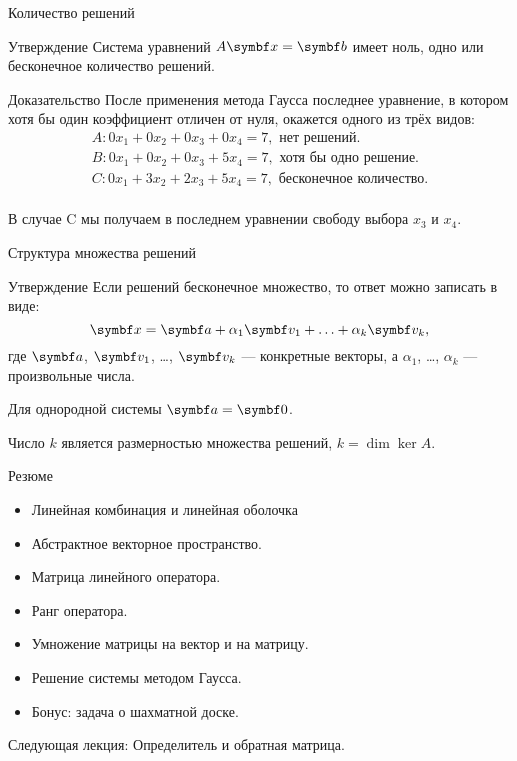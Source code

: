 \begin{frame}{Количество решений}
\begin{block}{Утверждение}
Система уравнений $A \bx = \bb$ имеет ноль, одно или бесконечное количество решений. 
\end{block}

\begin{block}{Доказательство}
После применения метода Гаусса последнее уравнение, в котором хотя бы один коэффициент 
отличен от нуля, окажется одного из трёх видов:
\[
\begin{array}{l}
A: 0x_1 + 0x_2 + 0x_3 + 0x_4 = 7, \text{ нет решений.}\\    
B: 0x_1 + 0x_2 + 0x_3 + 5x_4 = 7, \text{ хотя бы одно решение.} \\
C: 0x_1 + 3x_2 + 2x_3 + 5x_4 = 7, \text{ бесконечное количество.} \\
\end{array}
\]
\end{block}
\pause

В случае C мы получаем в последнем уравнении свободу выбора $x_3$ и $x_4$.

\end{frame}



\begin{frame}{Структура множества решений}

\begin{block}{Утверждение}
Если решений бесконечное множество, то ответ можно записать в виде:
\[
\bx = \ba + \alpha_1 \bv_1 + \ldots + \alpha_k \bv_k,
\]
где $\ba$, $\bv_1$, \ldots, $\bv_k$ — конкретные векторы, а
$\alpha_1$, \ldots, $\alpha_k$ — произвольные числа. 
\end{block}

\pause
Для однородной системы $\ba=\bzero$.

Число $k$ является размерностью множества решений, $k=\dim\ker A$.

\end{frame}




\begin{frame}{Резюме}


\begin{itemize}[<+->]
\item Линейная комбинация и линейная оболочка
\item Абстрактное векторное пространство.
\item Матрица линейного оператора.
\item Ранг оператора. 
\item Умножение матрицы на вектор и на матрицу.
\item Решение системы методом Гаусса.
\item Бонус: задача о шахматной доске.
\end{itemize}
\pause
\alert{Следующая лекция:} Определитель и обратная матрица.



\end{frame}
    